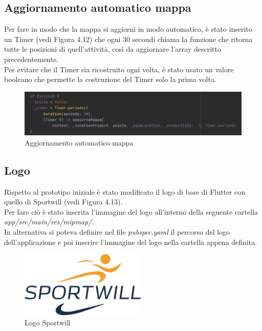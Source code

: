 \newpage

\subsection{Aggiornamento automatico mappa}
Per fare in modo che la mappa si aggiorni in modo automatico, è stato inserito un Timer (vedi Figura 4.12) che ogni 30 secondi chiama la funzione che ritorna tutte le posizioni di quell'attività, così da aggiornare l'array descritto precedentemente.\\
Per evitare che il Timer sia ricostruito ogni volta, è stato usato un valore booleano che permette la costruzione del Timer solo la prima volta.\\

\begin{figure}[htbp]	
	\centering
	\includegraphics[width=14cm]{immagini/automatico.png}
	\caption{Aggiornamento automatico mappa}
	\label{fig:Aggiornamento automatico mappa}
\end{figure}

\subsection{Logo}
Rispetto al prototipo iniziale è stato modificato il logo di base di Flutter con quello di Sportwill (vedi Figura 4.13).\\
Per  fare ciò è stato inserita l'immagine del logo all'interno della seguente cartella \textit{app/src/main/res/mipmap/}.\\
In alternativa si poteva definire nel file \textit{pubspec.yaml} il percorso del logo dell'applicazione e poi inserire l'immagine del logo nella cartella appena definita.\\

\begin{figure}[htbp]	
	\centering
	\includegraphics[width=6cm]{immagini/logosportwill.png}
	\caption{Logo Sportwill}
	\label{fig:Logo Sportwill}
\end{figure}

